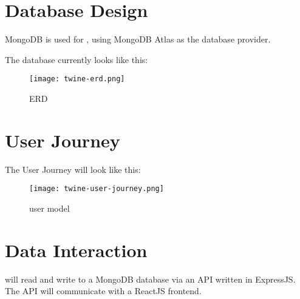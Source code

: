 \section{Database Design}
MongoDB is used for \serviceName, using MongoDB Atlas as the database provider.

The database currently looks like this:
\begin{figure}[ht]
    \centering
    \texttt{[image: twine-erd.png]}
    \caption{\serviceName ERD}
    \label{}
\end{figure}

\section{User Journey}
The User Journey will look like this:

\begin{figure}[ht]
    \centering
    \texttt{[image: twine-user-journey.png]}
    \caption{\serviceName user model}
    \label{find use}
\end{figure}

\section{Data Interaction}
\serviceName will read and write to a MongoDB database via an API written in ExpressJS. The API will communicate
with a ReactJS frontend.